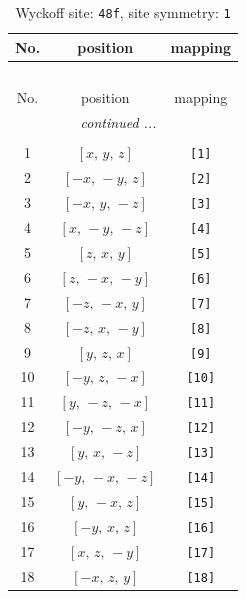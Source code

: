 \documentclass[fleqn,8pt]{jsarticle}
\begin{document}
\renewcommand{\arraystretch}{1.2}
\begin{longtable}{ccc}
\caption{Wyckoff site: {\tt 48f}, site symmetry: {\tt 1}}
 \\
 \hline \hline
No. & position & mapping \\ \hline \endfirsthead

\multicolumn{2}{l}{\tablename\ \thetable{}} \\
 \hline \hline
No. & position & mapping \\ \hline \endhead

 \hline \hline
\multicolumn{2}{r}{\footnotesize\it continued ...} \\ \endfoot

 \hline \hline
\multicolumn{2}{r}{} \\ \endlastfoot

1 & $\left[ x,\, y,\, z \right]$ & {\tt [1]} \\ \hline
2 & $\left[ - x,\, - y,\, z \right]$ & {\tt [2]} \\ \hline
3 & $\left[ - x,\, y,\, - z \right]$ & {\tt [3]} \\ \hline
4 & $\left[ x,\, - y,\, - z \right]$ & {\tt [4]} \\ \hline
5 & $\left[ z,\, x,\, y \right]$ & {\tt [5]} \\ \hline
6 & $\left[ z,\, - x,\, - y \right]$ & {\tt [6]} \\ \hline
7 & $\left[ - z,\, - x,\, y \right]$ & {\tt [7]} \\ \hline
8 & $\left[ - z,\, x,\, - y \right]$ & {\tt [8]} \\ \hline
9 & $\left[ y,\, z,\, x \right]$ & {\tt [9]} \\ \hline
10 & $\left[ - y,\, z,\, - x \right]$ & {\tt [10]} \\ \hline
11 & $\left[ y,\, - z,\, - x \right]$ & {\tt [11]} \\ \hline
12 & $\left[ - y,\, - z,\, x \right]$ & {\tt [12]} \\ \hline
13 & $\left[ y,\, x,\, - z \right]$ & {\tt [13]} \\ \hline
14 & $\left[ - y,\, - x,\, - z \right]$ & {\tt [14]} \\ \hline
15 & $\left[ y,\, - x,\, z \right]$ & {\tt [15]} \\ \hline
16 & $\left[ - y,\, x,\, z \right]$ & {\tt [16]} \\ \hline
17 & $\left[ x,\, z,\, - y \right]$ & {\tt [17]} \\ \hline
18 & $\left[ - x,\, z,\, y \right]$ & {\tt [18]} \\ \hline

\end{longtable}
\end{document}
